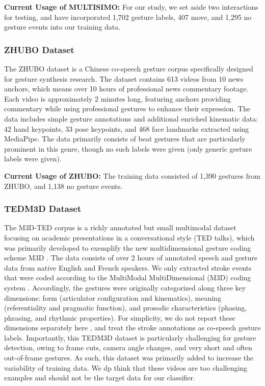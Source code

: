 \documentclass[11pt,headings=small,cleardoublepage=empty,tocflat,numbers=noenddot,twoside,captions=tableheading]{scrbook}
\begin{document}
\begin{refsection}
\textbf{Current Usage of MULTISIMO:} For our study, we set aside two interactions for testing, and have incorporated 1,702 gesture labels, 407 move, and 1,295 no gesture events into our training data.

\subsubsection{ZHUBO Dataset}
The ZHUBO dataset \parencite{baoEditableCoSpeechGesture2024} is a Chinese co-speech gesture corpus specifically designed for gesture synthesis research. The dataset contains 613 videos from 10 news anchors, which means over 10 hours of professional news commentary footage. Each video is approximately 2 minutes long, featuring anchors providing commentary while using professional gestures to enhance their expression. The data includes simple gesture annotations and additional enriched kinematic data: 42 hand keypoints, 33 pose keypoints, and 468 face landmarks extracted using MediaPipe. The data primarily consists of beat gestures that are particularly prominent in this genre, though no such labels were given (only generic gesture labels were given). 

\textbf{Current Usage of ZHUBO:} The training data consisted of 1,390 gestures from ZHUBO, and 1,138 no gesture events.

\subsubsection{TEDM3D Dataset}
The M3D-TED corpus \parencite{rohrerTemporalPragmaticAnalysis2022} is a richly annotated but small multimodal dataset focusing on academic presentations in a conversational style (TED talks), which was primarily developed to exemplify the new multidimensional gesture coding scheme M3D \parencite{rohrerTemporalPragmaticAnalysis2022}. The data consists of over 2 hours of annotated speech and gesture data from native English and French speakers. We only extracted stroke events that were coded according to the MultiModal MultiDimensional (M3D) coding system \parencite{rohrerMultiModalMultiDimensionalM3D}. Accordingly, the gestures were originally categorized along three key dimensions: form (articulator configuration and kinematics), meaning (referentiality and pragmatic function), and prosodic characteristics (phasing, phrasing, and rhythmic properties). For simplicity, we do not report these dimensions separately here \parencite{rohrerTemporalPragmaticAnalysis2022}, and treat the stroke annotations as co-speech gesture labels. Importantly, this TEDM3D dataset is  particularly challenging for gesture detection, owing to frame cuts, camera angle changes, and very short and often out-of-frame gestures. As such, this dataset was primarily added to increase the variability of training data. We dp think that these videos are too challenging examples and should not be the target data for our classifier.


\end{refsection}
\end{document}
